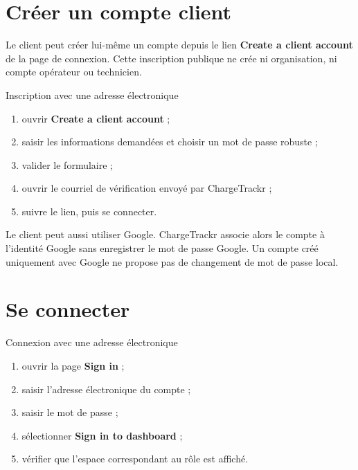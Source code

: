 
\section{Créer un compte client}

Le client peut créer lui-même un compte depuis le lien
\textbf{Create a client account} de la page de connexion. Cette inscription
publique ne crée ni organisation, ni compte opérateur ou technicien.

\begin{procedurebox}{Inscription avec une adresse électronique}
  \begin{enumerate}[leftmargin=1.6em]
    \item ouvrir \textbf{Create a client account} ;
    \item saisir les informations demandées et choisir un mot de passe robuste ;
    \item valider le formulaire ;
    \item ouvrir le courriel de vérification envoyé par ChargeTrackr ;
    \item suivre le lien, puis se connecter.
  \end{enumerate}
\end{procedurebox}

Le client peut aussi utiliser Google. ChargeTrackr associe alors le compte à
l'identité Google sans enregistrer le mot de passe Google. Un compte créé
uniquement avec Google ne propose pas de changement de mot de passe local.

\section{Se connecter}

\begin{procedurebox}{Connexion avec une adresse électronique}
  \begin{enumerate}[leftmargin=1.6em]
    \item ouvrir la page \textbf{Sign in} ;
    \item saisir l'adresse électronique du compte ;
    \item saisir le mot de passe ;
    \item sélectionner \textbf{Sign in to dashboard} ;
    \item vérifier que l'espace correspondant au rôle est affiché.
  \end{enumerate}
\end{procedurebox}

